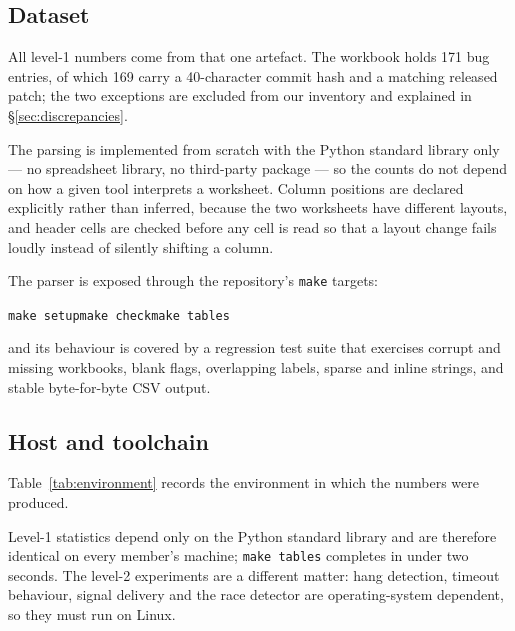 \documentclass[11pt]{article}
\begin{document}
\subsection{Dataset}

All level-1 numbers come from that one artefact. The workbook holds 171 bug
entries, of which 169 carry a 40-character commit hash and a matching
released patch; the two exceptions are excluded from our inventory and
explained in \S\ref{sec:discrepancies}.

The parsing is implemented from scratch with the Python standard library only
--- no spreadsheet library, no third-party package --- so the counts do not
depend on how a given tool interprets a worksheet. Column positions are
declared explicitly rather than inferred, because the two worksheets have
different layouts, and header cells are checked before any cell is read so
that a layout change fails loudly instead of silently shifting a column.

The parser is exposed through the repository's \texttt{make} targets:

\begin{center}
\texttt{make setup}\quad \texttt{make check}\quad \texttt{make tables}
\end{center}

and its behaviour is covered by a regression test suite that exercises
corrupt and missing workbooks, blank flags, overlapping labels, sparse and
inline strings, and stable byte-for-byte CSV output.

\subsection{Host and toolchain}

Table~\ref{tab:environment} records the environment in which the
numbers were produced.


Level-1 statistics depend only on the Python standard library and are
therefore identical on every member's machine; \texttt{make tables} completes
in under two seconds. The level-2 experiments are a different matter: hang
detection, timeout behaviour, signal delivery and the race detector are
operating-system dependent, so they must run on Linux.
\end{document}
